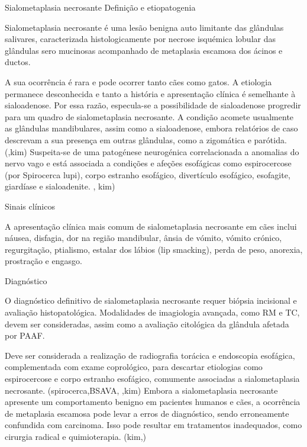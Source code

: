 Sialometaplasia necrosante
Definição e etiopatogenia


Sialometaplasia necrosante é uma lesão benigna auto limitante das glândulas salivares, caracterizada histologicamente	por necrose isquémica lobular das glândulas sero mucinosas acompanhado de metaplasia escamosa dos ácinos e ductos. \cite{Mukaratirwa2015,reiter_bsava_2018} 


A sua ocorrência é rara e pode ocorrer tanto cães como gatos. A etiologia permanece desconhecida e tanto a história e apresentação clínica é semelhante \cite{Han2016} à sialoadenose. Por essa razão, especula-se a possibilidade de sialoadenose progredir para um quadro de sialometaplasia necrosante. \cite{reiter_bsava_2018} A condição acomete usualmente as glândulas mandibulares, assim como a sialoadenose, embora relatórios de caso descrevam a sua presença em outras glândulas, como a zigomática e parótida. (\cite{perez-ecija_granulomatous_2012},kim) Suspeita-se de uma patogénese neurogénica correlacionada a anomalias do nervo vago  e está associada a condições e afeções esofágicas como espirocercose (por Spirocerca lupi), corpo estranho esofágico, divertículo esofágico, esofagite, giardíase e sialoadenite. \cite{reiter_bsava_2018,schoroeder}, kim)


Sinais clínicos


A apresentação clínica mais comum de sialometaplasia necrosante em cães inclui náusea, disfagia, dor na região mandibular, ânsia de vómito, vómito crónico, regurgitação, ptialismo, estalar dos lábios (lip smacking), perda de peso, anorexia, prostração e engasgo. \cite{Mukaratirwa2015,reiter_bsava_2018} 


Diagnóstico


O diagnóstico definitivo de sialometaplasia necrosante requer biópsia incisional e avaliação histopatológica. Modalidades de imagiologia avançada, como RM e TC, devem ser consideradas, assim como a avaliação citológica da glândula afetada por PAAF. \cite{reiter_bsava_2018}


Deve ser considerada a realização de radiografia torácica e endoscopia esofágica, complementada com exame coprológico, para descartar etiologias como espirocercose e corpo estranho esofágico, comumente associadas a sialometaplasia necrosante. (spirocerca,BSAVA, \cite{schoroeder},kim) Embora a sialometaplasia necrosante apresente um comportamento benigno em pacientes humanos e cães, a ocorrência de metaplasia escamosa pode levar a erros de diagnóstico, sendo erroneamente confundida com carcinoma. Isso pode resultar em tratamentos inadequados, como cirurgia radical e quimioterapia. (kim,\cite{Mukaratirwa2015})


